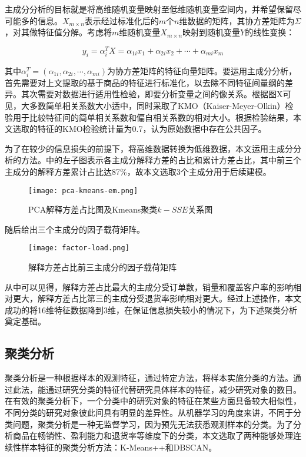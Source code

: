 \documentclass[lang=cn,11pt,a4paper,cite=authoryear]{elegantpaper}
\begin{document}
主成分分析的目标就是将高维随机变量映射至低维随机变量空间内，并希望保留尽可能多的信息。$X_{m \times n}$表示经过标准化后的$m$个$n$维数据的矩阵，其协方差矩阵为$\Sigma$，对其做特征值分解。考虑将$m$维随机变量$X_{m \times n}$映射到随机变量$Y$的线性变换：

\begin{equation}
  y_i = \alpha_{i}^T X = \alpha_{1i}x_1 +\alpha_{2i} x_2 + \cdots + \alpha_{mi} x_m
\end{equation}

其中$\alpha_i^T = (\alpha_{1i}, \alpha_{2i}, \cdots, \alpha_{mi})$为协方差矩阵的特征向量矩阵。要运用主成分分析，首先需要对上文提取的基于商品的特征进行标准化，以去除不同特征间量纲的差异。其次需要对数据进行适用性检验，即要分析变量之间的像关系。根据图X可见，大多数简单相关系数大小适中，同时采取了KMO（Kaiser-Meyer-Olkin）检验用于比较特征间的简单相关系数和偏自相关系数的相对大小。根据检验结果，本文选取的特征的KMO检验统计量为0.7，认为原始数据中存在公共因子。

为了在较少的信息损失的前提下，将高维数据转换为低维数据，本文运用主成分分析的方法。中的左子图表示各主成分解释方差的占比和累计方差占比，其中前三个主成分的解释方差累计占比达87\%，故本文选取3个主成分用于后续建模。
\begin{figure}[H]
  \centering
  \texttt{[image: pca-kmeans-em.png]}
  \caption{PCA解释方差占比图及Kmeans聚类$k-SSE$关系图}
  \label{主成分聚类}
\end{figure}

随后给出三个主成分的因子载荷矩阵。
\begin{figure}[H]
  \centering
  \texttt{[image: factor-load.png]}
  \caption{解释方差占比前三主成分的因子载荷矩阵}
  \label{因子载荷矩阵}
\end{figure}

从中可以见得，解释方差占比最大的主成分受订单数，销量和覆盖客户率的影响相对更大，解释方差占比第三的主成分受退货率影响相对更大。经过上述操作，本文成功的将16维特征数据降到3维，在保证信息损失较小的情况下，为下述聚类分析奠定基础。

\subsection{聚类分析}

聚类分析是一种根据样本的观测特征，通过特定方法，将样本实施分类的方法。通过此法，能通过研究分类的特征代替研究具体样本的特征，减少研究对象的数目。在有效的聚类分析下，一个分类中的研究对象的特征在某些方面具备较大相似性，不同分类的研究对象彼此间具有明显的差异性。从机器学习的角度来讲，不同于分类问题，聚类分析是一种无监督学习，因为预先无法获悉观测样本的分类。为了分析商品在畅销性、盈利能力和退货率等维度下的分类，本文选取了两种能够处理连续性样本特征的聚类分析方法：K-Means++和DBSCAN。
\end{document}
